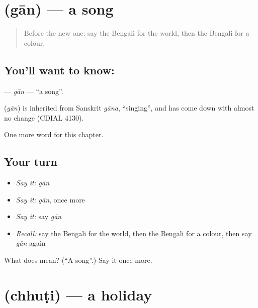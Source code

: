 \section[\texorpdfstring{\bn{গান} (gān)}{গান (gān)}]{ (gān) — a song}

\label{lesson:BN-C88-gan}



\begin{quote}
Before the new one: say the Bengali for the world, then the Bengali for a colour.
\end{quote}

\subsection*{You'll want to know: }
\textbf{} — \emph{gān} — \textquotedblleft{}a song\textquotedblright{}.

\begin{cousinweb}
\textbf{} (\emph{gān}) is inherited from Sanskrit \emph{gāna}, \textquotedblleft{}singing\textquotedblright{}, and has come down with almost no change (CDIAL 4130).
\end{cousinweb}

\begin{grammarlens}[title={What you've built}]
One more word for this chapter.
\end{grammarlens}

\subsection*{Your turn}
\begin{itemize}
\raggedright
  \item \emph{Say it:} \emph{gān}
  \item \emph{Say it:} \emph{gān}, once more
  \item \emph{Say it:} say \emph{gān}
  \item \emph{Recall:} say the Bengali for the world, then the Bengali for a colour, then say \emph{gān} again
\end{itemize}

\begin{tcolorbox}[breakable,colback=teal!4,colframe=teal!35!black,title={Before you move on}]
What does  mean? (\textquotedblleft{}A song\textquotedblright{}.) Say it once more.
\end{tcolorbox}
\section[\texorpdfstring{\bn{ছুটি} (chhuṭi)}{ছুটি (chhuṭi)}]{ (chhuṭi) — a holiday}

